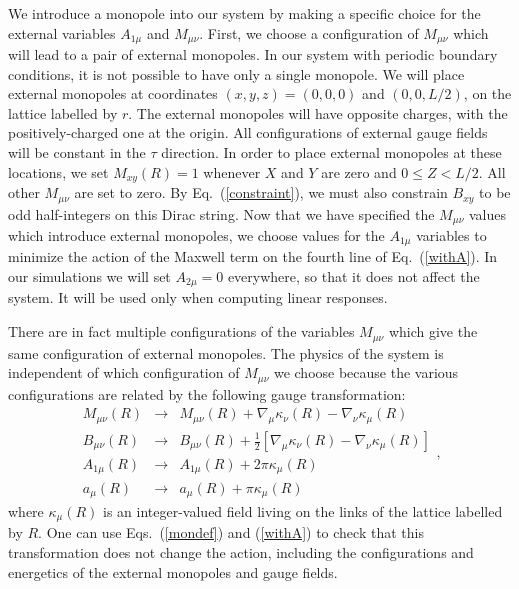 \documentclass[prb,twocolumn]{revtex4-1}
\begin{document}
We introduce a monopole into our system by making a specific choice for the external variables $A_{1\mu}$ and $M_{\mu\nu}$. First, we choose a configuration of $M_{\mu\nu}$ which will lead to a pair of external monopoles. In our system with periodic boundary conditions, it is not possible to have only a single monopole. We will place external monopoles at coordinates $(x,y,z)=(0,0,0)$ and $(0,0,L/2)$, on the lattice labelled by $r$. The external monopoles will have opposite charges, with the positively-charged one at the origin. All configurations of external gauge fields will be constant in the $\tau$ direction. In order to place external monopoles at these locations, we set $M_{xy}(R)=1$ whenever $X$ and $Y$ are zero and $0\leq Z<L/2$. All other $M_{\mu\nu}$ are set to zero. By Eq.~(\ref{constraint}), we must also constrain $B_{xy}$ to be odd half-integers on this Dirac string. Now that we have specified the $M_{\mu\nu}$ values which introduce external monopoles, we choose values for the $A_{1\mu}$ variables to minimize the action of the Maxwell term on the fourth line of Eq.~(\ref{withA}). In our simulations we will set $A_{2\mu}=0$ everywhere, so that it does not affect the system. It will be used only when computing linear responses. 

There are in fact multiple configurations of the variables $M_{\mu\nu}$ which give the same configuration of external monopoles. The physics of the system is independent of which configuration of $M_{\mu\nu}$ we choose because the various configurations are related by the following gauge transformation:
\begin{equation}
\begin{array}{ccc}
M_{\mu\nu}(R)&\rightarrow&M_{\mu\nu}(R)+\nabla_\mu \kappa_\nu(R)-\nabla_\nu \kappa_\mu(R) \\
B_{\mu\nu}(R)&\rightarrow&B_{\mu\nu}(R)+\frac{1}{2}[\nabla_\mu \kappa_\nu(R)-\nabla_\nu \kappa_\mu(R)] \\
A_{1\mu}(R)&\rightarrow&A_{1\mu}(R)+2\pi \kappa_\mu(R)\\
a_\mu(R)&\rightarrow&a_\mu(R)+\pi \kappa_\mu(R)
\end{array},
\end{equation}
where $\kappa_\mu(R)$ is an integer-valued field living on the links of the lattice labelled by $R$. One can use Eqs.~(\ref{mondef}) and (\ref{withA}) to check that this transformation does not change the action, %
including the configurations and energetics of the external monopoles and gauge fields.
\end{document}
